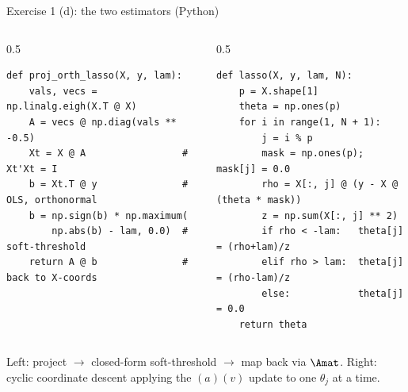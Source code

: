 \documentclass[aspectratio=169]{beamer}
\begin{document}
\begin{frame}[fragile]{Exercise 1 (d): the two estimators (Python)}
	\begin{columns}[T]
	\begin{column}{0.5\textwidth}
\begin{lstlisting}[style=pystyle, basicstyle=\ttfamily\tiny]
def proj_orth_lasso(X, y, lam):
    vals, vecs = np.linalg.eigh(X.T @ X)
    A = vecs @ np.diag(vals ** -0.5)
    Xt = X @ A                 # Xt'Xt = I
    b = Xt.T @ y               # OLS, orthonormal
    b = np.sign(b) * np.maximum(
        np.abs(b) - lam, 0.0)  # soft-threshold
    return A @ b               # back to X-coords
\end{lstlisting}
	\end{column}
	\begin{column}{0.5\textwidth}
\begin{lstlisting}[style=pystyle, basicstyle=\ttfamily\tiny]
def lasso(X, y, lam, N):
    p = X.shape[1]
    theta = np.ones(p)
    for i in range(1, N + 1):
        j = i % p
        mask = np.ones(p); mask[j] = 0.0
        rho = X[:, j] @ (y - X @ (theta * mask))
        z = np.sum(X[:, j] ** 2)
        if rho < -lam:   theta[j] = (rho+lam)/z
        elif rho > lam:  theta[j] = (rho-lam)/z
        else:            theta[j] = 0.0
    return theta
\end{lstlisting}
	\end{column}
	\end{columns}
	\medskip
	\footnotesize Left: project $\to$ closed-form soft-threshold $\to$ map back via $\Amat$. Right: cyclic coordinate descent applying the $(a)(v)$ update to one $\theta_j$ at a time.
\end{frame}
\end{document}
